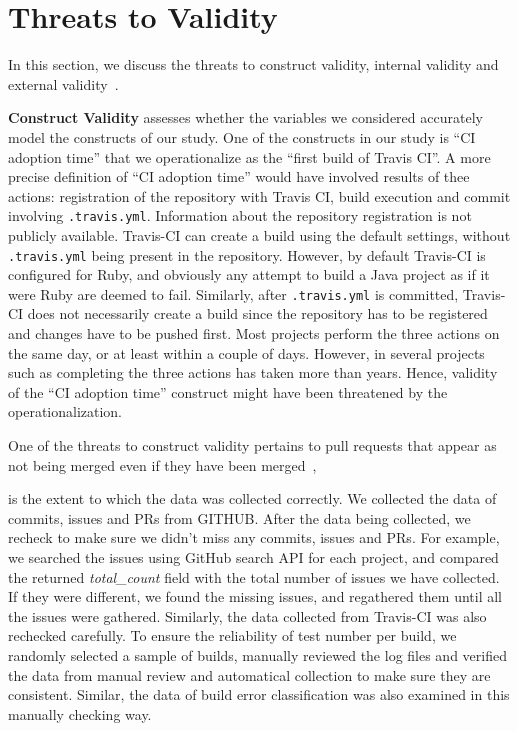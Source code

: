 
\section{Threats to Validity}
\label{sec:threats}
In this section, we discuss the threats to construct validity, internal validity  and external validity~\cite{perry2000empirical}.

\textbf{Construct Validity} assesses whether the variables we considered accurately model the constructs of our study. 
One of the constructs in our study is ``CI adoption time'' that we operationalize as the ``first build of Travis CI''. 
A more precise definition of ``CI adoption time'' would have involved results of thee actions: registration of the repository with Travis CI, build execution and commit involving \texttt{.travis.yml}.
Information about the repository registration is not publicly available. 
Travis-CI can create a build using the default settings, without \texttt{.travis.yml} being present in the repository.
However, by default Travis-CI is configured for Ruby, and obviously any attempt to build a Java project as if it were Ruby are deemed to fail.
Similarly, after \texttt{.travis.yml} is committed, Travis-CI does not necessarily create a build since the repository has to be registered and changes have to be pushed first. 
Most projects perform the three actions on the same day, or at least within a couple of days.
However, in several projects such as  completing the three actions has taken more than  years.
Hence, validity of the ``CI adoption time'' construct might have been threatened by the operationalization.

One of the threats to construct validity pertains to pull requests that  appear as not being merged even if they have been merged~\cite{Kalliamvakou2014Promises}, \ie 


is the extent to which the data was collected correctly. We collected the data of commits, issues and PRs from GITHUB. After the data being collected, we recheck to make sure we didn't miss any commits, issues and PRs. For example, we searched the issues using GitHub search API for each project, and compared the returned \textit{total\_count} field with the total number of issues we have collected. If they were different, we found the missing issues, and regathered them until all the issues were gathered. Similarly, the data collected from Travis-CI was also rechecked carefully. To ensure the reliability of test number per build, we randomly selected a sample of builds, manually reviewed the log files and verified the data from manual review and automatical collection to make sure they are consistent. Similar, the data of build error classification was also examined in this manually checking way.

